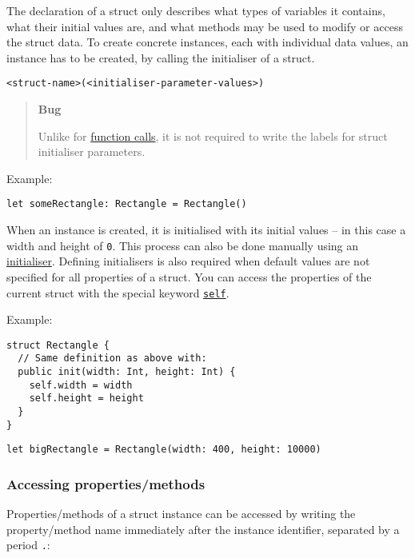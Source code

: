 The declaration of a struct only describes what types of variables it contains, what their initial values are, and what methods may be used to modify or access the struct data. To create concrete instances, each with individual data values, an instance has to be created, by calling the initialiser of a struct.

\begin{verbatim}
<struct-name>(<initialiser-parameter-values>)
\end{verbatim}

\begin{quote}
\textbf{Bug}

Unlike for \hyperref[sec:appendix-b-function-calls]{function calls}, it is not required to write the labels for struct initialiser parameters.
\end{quote}

Example:

\begin{verbatim}
let someRectangle: Rectangle = Rectangle()
\end{verbatim}

When an instance is created, it is initialised with its initial values – in this case a width and height of \texttt{0}. This process can also be done manually using an \hyperref[sec:appendix-b-initialisers]{initialiser}. Defining initialisers is also required when default values are not specified for all properties of a struct. You can access the properties of the current struct with the special keyword \hyperref[sec:appendix-b-self]{\texttt{self}}.

Example:

\begin{verbatim}
struct Rectangle {
  // Same definition as above with:
  public init(width: Int, height: Int) {
    self.width = width
    self.height = height
  }
}
\end{verbatim}

\begin{verbatim}
let bigRectangle = Rectangle(width: 400, height: 10000)
\end{verbatim}

\subsubsection{Accessing properties/methods}
\label{sec:appendix-b-accessing-propertiesmethods}

Properties/methods of a struct instance can be accessed by writing the property/method name immediately after the instance identifier, separated by a period \texttt{.}:

